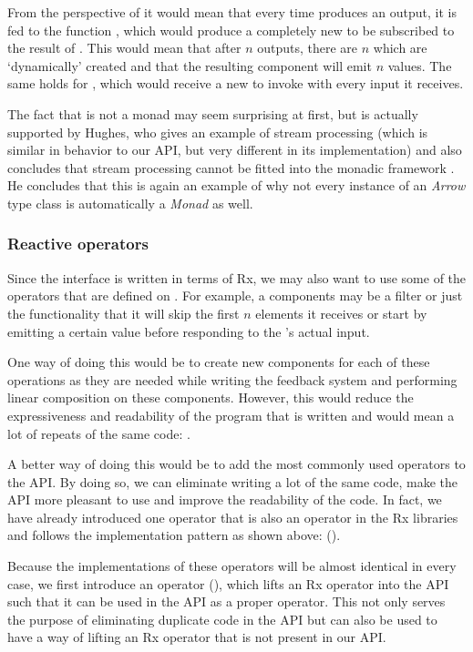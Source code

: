From the perspective of  it would mean that every time  produces an output, it is fed to the function , which would produce a completely new \comp to be subscribed to the result of . This would mean that after $n$ outputs, there are $n$ \comp which are `dynamically' created and that the resulting component will emit $n$ values. The same holds for , which would receive a new \comp to invoke with every input it receives.

The fact that \comp is not a monad may seem surprising at first, but is actually supported by Hughes, who gives an example of stream processing (which is similar in behavior to our API, but very different in its implementation) and also concludes that stream processing cannot be fitted into the monadic framework . He concludes that this is again an example of why not every instance of an \textit{Arrow} type class is automatically a \textit{Monad} as well.

\subsubsection{Reactive operators}
Since the \comp interface is written in terms of Rx, we may also want to use some of the operators that are defined on \obs. For example, a components may be a filter or just the functionality that it will skip the first $n$ elements it receives or start by emitting a certain value before responding to the \comp's actual input.

One way of doing this would be to create new components for each of these operations as they are needed while writing the feedback system and performing linear composition on these components. However, this would reduce the expressiveness and readability of the program that is written and would mean a lot of repeats of the same code: .

A better way of doing this would be to add the most commonly used operators to the \comp API. By doing so, we can eliminate writing a lot of the same code, make the API more pleasant to use and improve the readability of the code. In fact, we have already introduced one operator that is also an operator in the Rx libraries and follows the implementation pattern as shown above:  ().

Because the implementations of these operators will be almost identical in every case, we first introduce an operator  (), which lifts an Rx operator into the \comp API such that it can be used in the API as a proper operator. This not only serves the purpose of eliminating duplicate code in the API but can also be used to have a way of lifting an Rx operator that is not present in our API.

